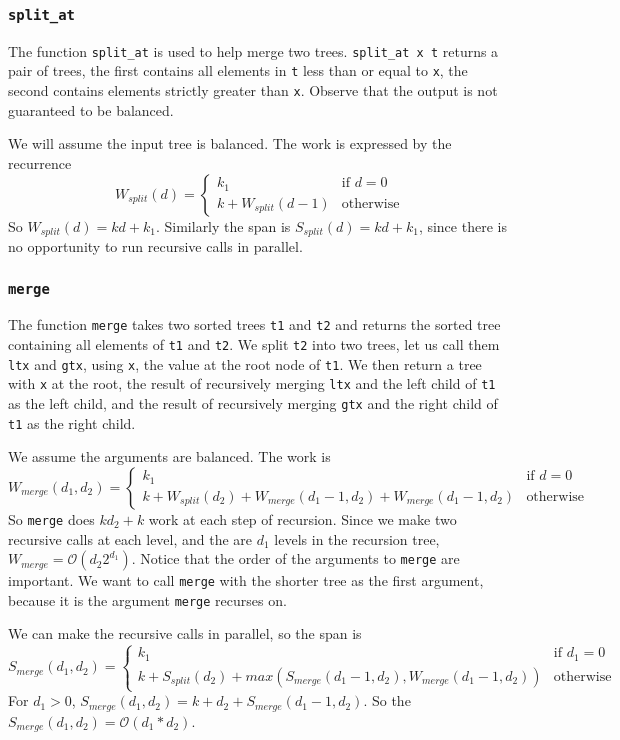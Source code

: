 \documentclass[12pt,letterpaper]{article}
\newcommand{\T}[1]{\texttt{#1}}
\begin{document}
\subsubsection{\T{split\_at}}
The function \T{split\_at} is used to help merge two trees.
\T{split\_at x t} returns a pair of trees, the first contains all elements in \T{t} less than or equal to \T{x}, the second contains elements strictly greater than \T{x}.
Observe that the output is not guaranteed to be balanced.

We will assume the input tree is balanced.
The work is expressed by the recurrence
\[ W_{split}(d) =
  \begin{cases}
    k_1 & \text{if } d=0\\
    k + W_{split}(d-1) & \text{otherwise}
  \end{cases}
\]
So $W_{split}(d) = kd + k_1$.
Similarly the span is $S_{split}(d) = kd + k_1$, since there is no opportunity to run recursive calls in parallel.


\subsubsection{\T{merge}}
The function \T{merge} takes two sorted trees \T{t1} and \T{t2} and returns the sorted tree containing all elements of \T{t1} and \T{t2}.
We split \T{t2} into two trees, let us call them \T{ltx} and \T{gtx}, using \T{x}, the value at the root node of \T{t1}.
We then return a tree with \T{x} at the root, the result of recursively merging \T{ltx} and the left child of \T{t1} as the left child, and the result of recursively merging \T{gtx} and the right child of \T{t1} as the right child.

We assume the arguments are balanced.
The work is 
\[ W_{merge}(d_1, d_2) =
  \begin{cases}
    k_1 & \text{if } d=0\\
    k + W_{split}(d_2) + W_{merge}(d_1-1,d_2) + W_{merge}(d_1-1,d_2) & \text{otherwise}
  \end{cases}
\]
So \T{merge} does $kd_2 + k$ work at each step of recursion.
Since we make two recursive calls at each level, and the are $d_1$ levels in the recursion tree,
$W_{merge} = \mathcal{O}(d_2 2^{d_1})$.
Notice that the order of the arguments to \T{merge} are important.
We want to call \T{merge} with the shorter tree as the first argument, because it is the argument \T{merge} recurses on.

We can make the recursive calls in parallel, so the span is
\[ S_{merge}(d_1, d_2) =
  \begin{cases}
    k_1 & \text{if } d_1=0\\
    k + S_{split}(d_2) + max(S_{merge}(d_1-1,d_2),W_{merge}(d_1-1,d_2)) & \text{otherwise}
  \end{cases}
\]
For $d_1>0$, $S_{merge}(d_1, d_2) = k + d_2 + S_{merge}(d_1-1,d_2)$.
So the $S_{merge}(d_1, d_2) = \mathcal{O}(d_1*d_2)$.
\end{document}
